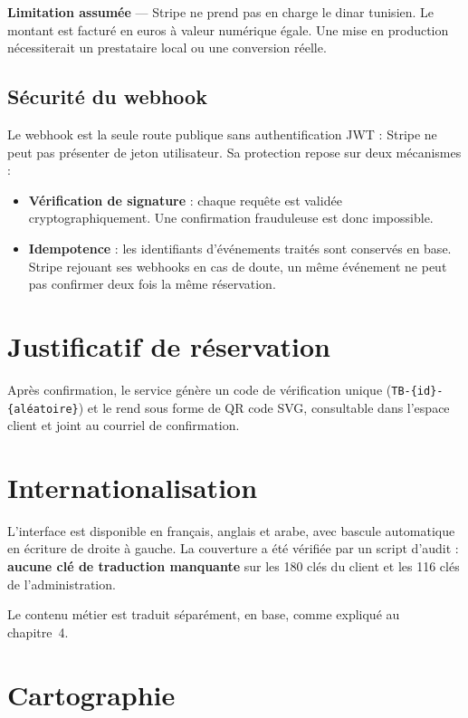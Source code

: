 \documentclass[11pt,a4paper]{report}
\newcommand{\tbnote}[1]{\par\vspace{4pt}\noindent%
  \colorbox{tbSand}{\parbox{\dimexpr\linewidth-2\fboxsep}{\small #1}}\par\vspace{4pt}}
\begin{document}
\tbnote{\textbf{Limitation assumée} — Stripe ne prend pas en charge le dinar
tunisien. Le montant est facturé en euros à valeur numérique égale. Une mise en
production nécessiterait un prestataire local ou une conversion réelle.}

\subsection{Sécurité du webhook}

Le webhook est la seule route publique sans authentification JWT : Stripe ne
peut pas présenter de jeton utilisateur. Sa protection repose sur deux
mécanismes :

\begin{itemize}
  \item \textbf{Vérification de signature} : chaque requête est validée
    cryptographiquement. Une confirmation frauduleuse est donc impossible.
  \item \textbf{Idempotence} : les identifiants d'événements traités sont
    conservés en base. Stripe rejouant ses webhooks en cas de doute, un même
    événement ne peut pas confirmer deux fois la même réservation.
\end{itemize}

\section{Justificatif de réservation}

Après confirmation, le service génère un code de vérification unique
(\texttt{TB-\{id\}-\{aléatoire\}}) et le rend sous forme de QR code SVG,
consultable dans l'espace client et joint au courriel de confirmation.

\section{Internationalisation}

L'interface est disponible en français, anglais et arabe, avec bascule
automatique en écriture de droite à gauche. La couverture a été vérifiée par un
script d'audit : \textbf{aucune clé de traduction manquante} sur les 180 clés du
client et les 116 clés de l'administration.

Le contenu métier est traduit séparément, en base, comme expliqué au
chapitre~4.

\section{Cartographie}
\end{document}
